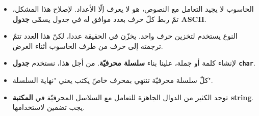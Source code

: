 \begin{itemize}
  \item الحاسوب لا يجيد التعامل مع النصوص، هو لا يعرف إلّا الأعداد. لإصلاح هذا المشكل، تمّ ربط كلّ حرف بعدد موافق له في جدول يسمّى
  \textbf{جدول \textenglish{ASCII}}.
  \item النوع  يستخدم لتخزين حرف واحد. يخزّن في الحقيقة عددا، لكنّ هذا العدد تتمّ ترجمته إلى حرف من طرف الحاسوب أثناء العرض.
  \item لإنشاء كلمة أو جملة، علينا بناء
  \textbf{سلسلة محرفيّة}.
  من أجل هذا، نستخدم
  \textbf{جدول \texttt{char}}.
  \item كلّ سلسلة محرفيّة تنتهي بمحرف خاصّ يكتب
  يعني "نهاية السلسلة".
  \item توجد الكثير من الدوال الجاهزة للتعامل مع السلاسل المحرفيّة في
  \textbf{المكتبة \textenglish{string}}.
  يجب تضمين
  لاستخدامها.
\end{itemize}
